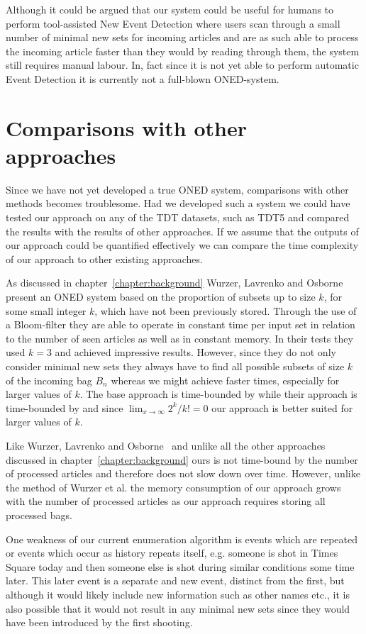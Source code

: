Although it could be argued that our system could be useful for humans to perform tool-assisted New Event Detection where users scan through a small number of minimal new sets for incoming articles and are as such able to process the incoming article faster than they would by reading through them, the system still requires manual labour. In, fact since it is not yet able to perform automatic Event Detection it is currently not a full-blown ONED-system.

\section{Comparisons with other approaches}
Since we have not yet developed a true ONED system, comparisons with other methods becomes troublesome. Had we developed such a system we could have tested our approach on any of the TDT datasets, such as TDT5 and compared the results with the results of other approaches. If we assume that the outputs of our approach could be quantified effectively we can compare the time complexity of our approach to other existing approaches.

As discussed in chapter~\ref{chapter:background} Wurzer, Lavrenko and Osborne~\cite{wurzer2015kterm} present an ONED system based on the proportion of subsets up to size $k$, for some small integer $k$, which have not been previously stored. Through the use of a Bloom-filter they are able to operate in constant time per input set in relation to the number of seen articles as well as in constant memory. In their tests they used $k=3$ and achieved impressive results. However, since they do not only consider minimal new sets they always have to find all possible subsets of size $k$ of the incoming bag $B_{n}$ whereas we might achieve faster times, especially for larger values of $k$. The base approach is time-bounded by  while their approach is time-bounded by  and since $\lim_{x \to \infty}2^{k}/k!=0$ our approach is better suited for larger values of $k$. 

Like Wurzer, Lavrenko and Osborne~\cite{wurzer2015kterm} and unlike all the other approaches discussed in chapter~\ref{chapter:background} ours is not time-bound by the number of processed articles and therefore does not slow down over time. However, unlike the method of Wurzer et al. the memory consumption of our approach grows with the number of processed articles as our approach requires storing all processed bags. 

One weakness of our current enumeration algorithm is events which are repeated or events which occur as history repeats itself, e.g. someone is shot in Times Square today and then someone else is shot during similar conditions some time later. This later event is a separate and new event, distinct from the first, but although it would likely include new information such as other names etc., it is also possible that it would not result in any minimal new sets since they would have been introduced by the first shooting.

